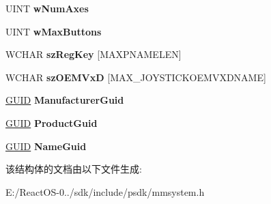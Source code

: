 \begin{DoxyCompactItemize}
\mbox{\label{structtag_j_o_y_c_a_p_s2_w_a29e0b8ffadb984484b186c0b8db80766}} 
U\+I\+NT {\bfseries w\+Num\+Axes}
\item 
\mbox{\label{structtag_j_o_y_c_a_p_s2_w_aa60055068e79b11c6a4ae7f2e4c56d8f}} 
U\+I\+NT {\bfseries w\+Max\+Buttons}
\item 
\mbox{\label{structtag_j_o_y_c_a_p_s2_w_ac99cc93c4f934dcac78c2b74698759a0}} 
W\+C\+H\+AR {\bfseries sz\+Reg\+Key} \mbox{[}M\+A\+X\+P\+N\+A\+M\+E\+L\+EN\mbox{]}
\item 
\mbox{\label{structtag_j_o_y_c_a_p_s2_w_a3c8221b88c890cdc052bcb986d5c3854}} 
W\+C\+H\+AR {\bfseries sz\+O\+E\+M\+VxD} \mbox{[}M\+A\+X\+\_\+\+J\+O\+Y\+S\+T\+I\+C\+K\+O\+E\+M\+V\+X\+D\+N\+A\+ME\mbox{]}
\item 
\mbox{\label{structtag_j_o_y_c_a_p_s2_w_a77001ca00b81851a54a93f9e92640bd2}} 
\hyperlink{interface_g_u_i_d}{G\+U\+ID} {\bfseries Manufacturer\+Guid}
\item 
\mbox{\label{structtag_j_o_y_c_a_p_s2_w_a7b464ad96427e0402384789393316e0a}} 
\hyperlink{interface_g_u_i_d}{G\+U\+ID} {\bfseries Product\+Guid}
\item 
\mbox{\label{structtag_j_o_y_c_a_p_s2_w_ad19de2c6da96a7ac26cc53b2a863159a}} 
\hyperlink{interface_g_u_i_d}{G\+U\+ID} {\bfseries Name\+Guid}
\end{DoxyCompactItemize}


该结构体的文档由以下文件生成\+:\begin{DoxyCompactItemize}
\item 
E\+:/\+React\+O\+S-\/0../sdk/include/psdk/mmsystem.\+h\end{DoxyCompactItemize}
